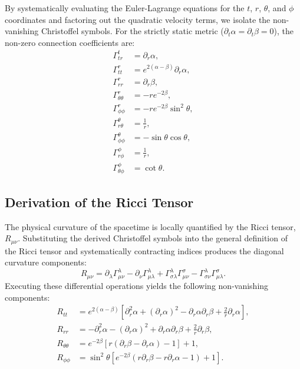 \documentclass[11pt, a4paper]{report}
\begin{document}
By systematically evaluating the Euler-Lagrange equations for the $t$, $r$, $\theta$, and $\phi$ coordinates and factoring out the quadratic velocity terms, we isolate the non-vanishing Christoffel symbols. For the strictly static metric ($\partial_t \alpha = \partial_t \beta = 0$), the non-zero connection coefficients are:
\begin{align}
\Gamma^t_{tr} &= \partial_r \alpha, \\
\Gamma^r_{tt} &= e^{2(\alpha - \beta)} \partial_r \alpha, \\
\Gamma^r_{rr} &= \partial_r \beta, \\
\Gamma^r_{\theta\theta} &= -r e^{-2\beta}, \\
\Gamma^r_{\phi\phi} &= -r e^{-2\beta} \sin^2\theta, \\
\Gamma^\theta_{r\theta} &= \frac{1}{r}, \\
\Gamma^\theta_{\phi\phi} &= -\sin\theta \cos\theta, \\
\Gamma^\phi_{r\phi} &= \frac{1}{r}, \\
\Gamma^\phi_{\theta\phi} &= \cot\theta.
\end{align}

\subsection{Derivation of the Ricci Tensor}
The physical curvature of the spacetime is locally quantified by the Ricci tensor, $R_{\mu\nu}$. Substituting the derived Christoffel symbols into the general definition of the Ricci tensor and systematically contracting indices produces the diagonal curvature components:
\begin{equation}
R_{\mu\nu} = \partial_\lambda \Gamma^\lambda_{\mu\nu} - \partial_\nu \Gamma^\lambda_{\mu\lambda} + \Gamma^\lambda_{\sigma\lambda} \Gamma^\sigma_{\mu\nu} - \Gamma^\lambda_{\sigma\nu} \Gamma^\sigma_{\mu\lambda}.
\end{equation}
Executing these differential operations yields the following non-vanishing components:
\begin{align}
R_{tt} &= e^{2(\alpha-\beta)} \left[ \partial_r^2\alpha + (\partial_r\alpha)^2 - \partial_r\alpha\partial_r\beta + \frac{2}{r}\partial_r\alpha \right], \\
R_{rr} &= -\partial_r^2\alpha - (\partial_r\alpha)^2 + \partial_r\alpha\partial_r\beta + \frac{2}{r}\partial_r\beta, \\
R_{\theta\theta} &= e^{-2\beta} \left[ r(\partial_r\beta - \partial_r\alpha) - 1 \right] + 1, \\
R_{\phi\phi} &= \sin^2\theta \left[ e^{-2\beta} \left( r\partial_r\beta - r\partial_r\alpha - 1 \right) + 1 \right].
\end{align}
\end{document}
